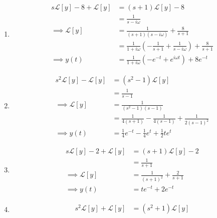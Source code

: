 \documentclass[a4paper]{article}
\begin{document}
\begin{enumerate}[label=(\alph*)]
	\item \begin{align*}
		s \mathcal{L}\!\left[ y \right] - 8 + \mathcal{L}\!\left[ y \right] & = \!\left( s + 1 \right) \mathcal{L}\!\left[ y \right] - 8 \\
										    & = \displaystyle{\frac{1}{s - i \omega}} \\
		\implies \mathcal{L}\!\left[ y \right] & = \frac{1}{\!\left( s + 1 \right)\!\left( s - i \omega \right)} + \frac{8}{s + 1} \\
						       & = \frac{1}{1 + i \omega}\!\left( -\frac{1}{s + 1} + \frac{1}{s - i \omega} \right) + \frac{8}{s + 1} \\
		         \implies y \!\left( t \right) & = \frac{1}{1 + i \omega} \!\left( -e^{-t} + e^{i \omega t} \right) + 8e^{-t}
	\end{align*}
	\item \begin{align*}
		s^{2}\mathcal{L}\!\left[ y \right] - \mathcal{L}\!\left[ y \right] & = \!\left( s^{2} - 1 \right)\mathcal{L}\!\left[ y \right] \\
		 & = \frac{1}{s - 1} \\ 
		\implies \mathcal{L}\!\left[ y \right] & = \frac{1}{\!\left( s^{2} - 1 \right)\!\left( s - 1 \right)} \\
						       & = \frac{1}{4 \!\left( s + 1 \right)} - \frac{1}{4 \!\left( s - 1 \right)} + \frac{1}{2 \!\left( s - 1 \right)^{2}} \\
			 \implies y \!\left( t \right) & = \frac{1}{4}e^{-t} - \frac{1}{4}e^{t} + \frac{1}{2}te^{t}
	\end{align*}
	\item \begin{align*}
		s \mathcal{L}\!\left[ y \right] - 2 + \mathcal{L}\!\left[ y \right] & = \!\left( s + 1 \right)\mathcal{L}\!\left[ y \right] - 2 \\
										& = \frac{1}{s + 1} \\
		 \implies \mathcal{L}\!\left[ y \right] & = \frac{1}{\!\left( s + 1 \right)^{2}} + \frac{2}{s + 1} \\
			  \implies y \!\left( t \right) & = te^{-t} + 2e^{-t}
	\end{align*}
	\item \begin{align*}
		s^{2}\mathcal{L}\!\left[ y \right] + \mathcal{L}\!\left[ y \right] & = \!\left( s^{2} + 1 \right)\mathcal{L}\!\left[ y \right] \\

\end{align*}
\end{enumerate}
\end{document}
